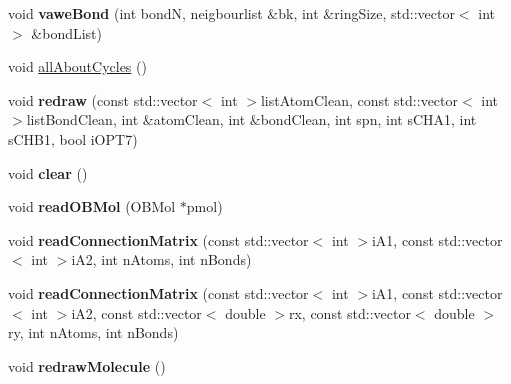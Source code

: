\begin{DoxyCompactItemize}
\item 
\hypertarget{class_open_babel_1_1_t_simple_molecule_a7979c2bedd07ee7a2453837d5d2fc54a}{void {\bfseries vawe\-Bond} (int bond\-N, neigbourlist \&bk, int \&ring\-Size, std\-::vector$<$ int $>$ \&bond\-List)}\label{class_open_babel_1_1_t_simple_molecule_a7979c2bedd07ee7a2453837d5d2fc54a}

\item 
void \hyperlink{class_open_babel_1_1_t_simple_molecule_a3bf3c13e10ec443205450e1090aa3f54}{all\-About\-Cycles} ()
\item 
\hypertarget{class_open_babel_1_1_t_simple_molecule_a4e19c6d01558d818df9a4d00357bb3e1}{void {\bfseries redraw} (const std\-::vector$<$ int $>$list\-Atom\-Clean, const std\-::vector$<$ int $>$list\-Bond\-Clean, int \&atom\-Clean, int \&bond\-Clean, int spn, int s\-C\-H\-A1, int s\-C\-H\-B1, bool i\-O\-P\-T7)}\label{class_open_babel_1_1_t_simple_molecule_a4e19c6d01558d818df9a4d00357bb3e1}

\item 
\hypertarget{class_open_babel_1_1_t_simple_molecule_ac4954400c6b5bb5641e5e17b17b57e0e}{void {\bfseries clear} ()}\label{class_open_babel_1_1_t_simple_molecule_ac4954400c6b5bb5641e5e17b17b57e0e}

\item 
\hypertarget{class_open_babel_1_1_t_simple_molecule_abd102e59ddba656614f9528e0d1ae2fe}{void {\bfseries read\-O\-B\-Mol} (O\-B\-Mol $\ast$pmol)}\label{class_open_babel_1_1_t_simple_molecule_abd102e59ddba656614f9528e0d1ae2fe}

\item 
\hypertarget{class_open_babel_1_1_t_simple_molecule_ae7aaf3e7e316e6cd1d1ce917e5362a8f}{void {\bfseries read\-Connection\-Matrix} (const std\-::vector$<$ int $>$i\-A1, const std\-::vector$<$ int $>$i\-A2, int n\-Atoms, int n\-Bonds)}\label{class_open_babel_1_1_t_simple_molecule_ae7aaf3e7e316e6cd1d1ce917e5362a8f}

\item 
\hypertarget{class_open_babel_1_1_t_simple_molecule_a329a44255da4de5fb2e51e6893b8c075}{void {\bfseries read\-Connection\-Matrix} (const std\-::vector$<$ int $>$i\-A1, const std\-::vector$<$ int $>$i\-A2, const std\-::vector$<$ double $>$rx, const std\-::vector$<$ double $>$ry, int n\-Atoms, int n\-Bonds)}\label{class_open_babel_1_1_t_simple_molecule_a329a44255da4de5fb2e51e6893b8c075}

\item 
\hypertarget{class_open_babel_1_1_t_simple_molecule_aa35025ae38dad03f8884827443ec5973}{void {\bfseries redraw\-Molecule} ()}\label{class_open_babel_1_1_t_simple_molecule_aa35025ae38dad03f8884827443ec5973}


\end{DoxyCompactItemize}
